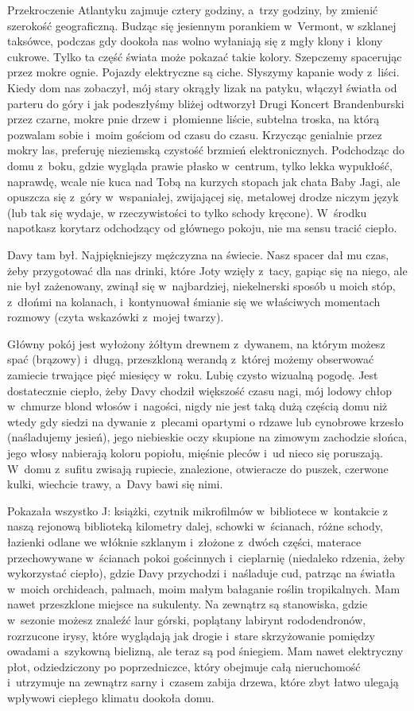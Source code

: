 \documentclass[oneside,polish,12pt,sfheadings]{mwbk}
\begin{document}
Przekroczenie Atlantyku zajmuje cztery godziny, a~trzy godziny, by
zmienić szerokość geograficzną. Budząc się jesiennym porankiem w~Vermont,
w szklanej taksówce, podczas gdy dookoła nas wolno wyłaniają się z
mgły klony i~klony cukrowe. Tylko ta część świata może pokazać takie
kolory. Szepczemy spacerując przez mokre ognie. Pojazdy elektryczne
są ciche. Słyszymy kapanie wody z~liści. Kiedy dom nas zobaczył, mój
stary okrągły lizak na patyku, włączył światła od parteru do góry
i jak podeszłyśmy bliżej odtworzył Drugi Koncert Brandenburski przez
czarne, mokre pnie drzew i~płomienne liście, subtelna troska, na którą
pozwalam sobie i~moim gościom od czasu do czasu. Krzycząc genialnie
przez mokry las, preferuję nieziemską czystość brzmień elektronicznych.
Podchodząc do domu z~boku, gdzie wygląda prawie płasko w~centrum,
tylko lekka wypukłość, naprawdę, wcale nie kuca nad Tobą na kurzych
stopach jak chata Baby Jagi, ale opuszcza się z~góry w~wspaniałej,
zwijającej się, metalowej drodze niczym język (lub tak się wydaje,
w rzeczywistości to tylko schody kręcone). W~środku napotkasz korytarz
odchodzący od głównego pokoju, nie ma sensu tracić ciepło.

Davy tam był. Najpiękniejszy mężczyzna na świecie. Nasz spacer dał
mu czas, żeby przygotować dla nas drinki, które Joty wzięły z~tacy,
gapiąc się na niego, ale nie był zażenowany, zwinął się w~najbardziej,
niekelnerski sposób u moich stóp, z~dłońmi na kolanach, i~kontynuował
śmianie się we właściwych momentach rozmowy (czyta wskazówki z~mojej
twarzy).

Główny pokój jest wyłożony żółtym drewnem z~dywanem, na którym możesz
spać (brązowy) i~długą, przeszkloną werandą z~której możemy obserwować
zamiecie trwające pięć miesięcy w~roku. Lubię czysto wizualną pogodę.
Jest dostatecznie ciepło, żeby Davy chodził większość czasu nagi,
mój lodowy chłop w~chmurze blond włosów i~nagości, nigdy nie jest
taką dużą częścią domu niż wtedy gdy siedzi na dywanie z~plecami opartymi
o rdzawe lub cynobrowe krzesło (naśladujemy jesień), jego niebieskie
oczy skupione na zimowym zachodzie słońca, jego włosy nabierają koloru
popiołu, mięśnie pleców i~ud nieco się poruszają. W~domu z~sufitu
zwisają rupiecie, znalezione, otwieracze do puszek, czerwone kulki,
wiechcie trawy, a~Davy bawi się nimi.

Pokazała wszystko J: książki, czytnik mikrofilmów w~bibliotece w~kontakcie
z naszą rejonową biblioteką kilometry dalej, schowki w~ścianach, różne
schody, łazienki odlane we włóknie szklanym i~złożone z~dwóch części,
materace przechowywane w~ścianach pokoi gościnnych i~cieplarnię (niedaleko
rdzenia, żeby wykorzystać ciepło), gdzie Davy przychodzi i~naśladuje
cud, patrząc na światła w~moich orchideach, palmach, moim małym bałaganie
roślin tropikalnych. Mam nawet przeszklone miejsce na sukulenty. Na
zewnątrz są stanowiska, gdzie w~sezonie możesz znaleźć laur górski,
poplątany labirynt rododendronów, rozrzucone irysy, które wyglądają
jak drogie i~stare skrzyżowanie pomiędzy owadami a~szykowną bielizną,
ale teraz są pod śniegiem. Mam nawet elektryczny płot, odziedziczony
po poprzedniczce, który obejmuje całą nieruchomość i~utrzymuje na
zewnątrz sarny i~czasem zabija drzewa, które zbyt łatwo ulegają wpływowi
ciepłego klimatu dookoła domu.
\end{document}
